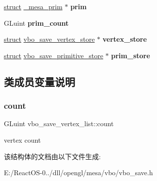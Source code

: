 \begin{DoxyCompactItemize}
\hyperlink{interfacestruct}{struct} \hyperlink{struct__mesa__prim}{\+\_\+mesa\+\_\+prim} $\ast$ {\bfseries prim}
\item 
\mbox{\label{structvbo__save__vertex__list_aa2e53a43f6c448b70ea192829e2b4fba}} 
G\+Luint {\bfseries prim\+\_\+count}
\item 
\mbox{\label{structvbo__save__vertex__list_a163ffd828861de2d87c10bea31c840bc}} 
\hyperlink{interfacestruct}{struct} \hyperlink{structvbo__save__vertex__store}{vbo\+\_\+save\+\_\+vertex\+\_\+store} $\ast$ {\bfseries vertex\+\_\+store}
\item 
\mbox{\label{structvbo__save__vertex__list_a03c5e894a2b649b6f0dc36efa08df0ca}} 
\hyperlink{interfacestruct}{struct} \hyperlink{structvbo__save__primitive__store}{vbo\+\_\+save\+\_\+primitive\+\_\+store} $\ast$ {\bfseries prim\+\_\+store}
\end{DoxyCompactItemize}


\subsection{类成员变量说明}
\mbox{\label{structvbo__save__vertex__list_a5c5b44780d0c33653c8c610fb26e108d}} 
\subsubsection{\texorpdfstring{count}{count}}
{\footnotesize\ttfamily G\+Luint vbo\+\_\+save\+\_\+vertex\+\_\+list\+::count}

vertex count 

该结构体的文档由以下文件生成\+:\begin{DoxyCompactItemize}
\item 
E\+:/\+React\+O\+S-\/0../dll/opengl/mesa/vbo/vbo\+\_\+save.\+h\end{DoxyCompactItemize}
